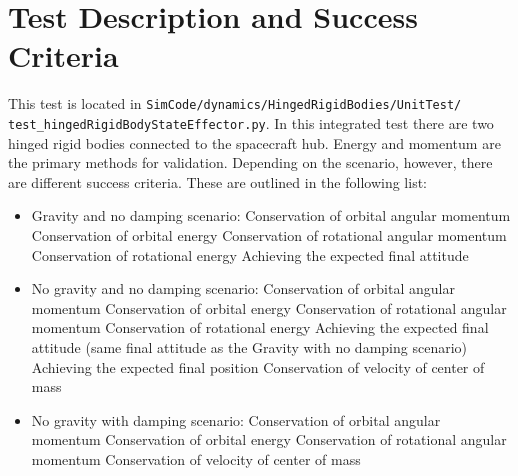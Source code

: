 \section{Test Description and Success Criteria}
This test is located in \texttt{SimCode/dynamics/HingedRigidBodies/UnitTest/\newline
test\_hingedRigidBodyStateEffector.py}. In this integrated test there are two hinged rigid bodies connected to the spacecraft hub. Energy and momentum are the primary methods for validation. Depending on the scenario, however, there are different success criteria. These are outlined in the following list:
\begin{itemize}
	\item Gravity and no damping scenario:
	\subitem Conservation of orbital angular momentum
	\subitem Conservation of orbital energy
	\subitem Conservation of rotational angular momentum
	\subitem Conservation of rotational energy
	\subitem Achieving the expected final attitude
	\item No gravity and no damping scenario:
\subitem Conservation of orbital angular momentum
\subitem Conservation of orbital energy
\subitem Conservation of rotational angular momentum
\subitem Conservation of rotational energy
\subitem Achieving the expected final attitude (same final attitude as the Gravity with no damping scenario)
\subitem Achieving the expected final position
\subitem Conservation of velocity of center of mass
	\item No gravity with damping scenario:
\subitem Conservation of orbital angular momentum
\subitem Conservation of orbital energy
\subitem Conservation of rotational angular momentum
\subitem Conservation of velocity of center of mass

\end{itemize}
